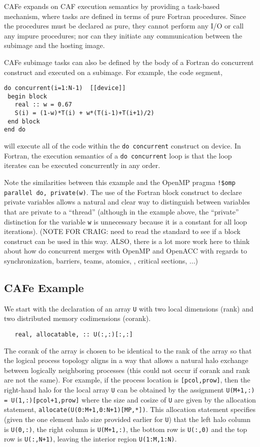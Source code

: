 CAFe expands on CAF execution semantics by providing a task-based mechanism, where tasks
are defined in terms of pure Fortran procedures.  Since the procedures must be declared
as pure, they cannot perform any I/O or call any impure procedures; nor can they initiate
any communication between the subimage and the hosting image.

CAFe subimage tasks can also be defined by the body of a Fortran do concurrent construct
and executed on a subimage.  For example, the code segment,
\begin{verbatim}
do concurrent(i=1:N-1)  [[device]]
 begin block
   real :: w = 0.67
   S(i) = (1-w)*T(i) + w*(T(i-1)+T(i+1)/2)
 end block
end do
\end{verbatim}
will execute all of the code within the \texttt{do concurrent} construct on device.  In
Fortran, the execution semantics of a \texttt{do concurrent} loop is that the loop
iterates can be executed concurrently in any order.

Note the similarities between this example and the OpenMP pragma \texttt{!\$omp parallel do,
private(w)}.  The use of the Fortran block construct to declare private
variables allows a natural and clear way to distinguish between variables that are private
to a ``thread'' (although in the example above, the ``private'' distinction for the
variable \texttt{w} is unnecessary because it is a constant for all loop iterations).
(NOTE FOR CRAIG: need to read the standard to see if a block construct can be used in this
way. ALSO, there is a lot more work here to think about how do concurrent merges with
OpenMP and OpenACC with regards to synchronization, barriers, teams, atomics,
, critical sections, ...)



\subsection{CAFe Example}

We start with the declaration of an array \texttt{U} with two local dimensions (rank) and
two distributed memory codimensions (corank).
\begin{verbatim}
   real, allocatable, :: U(:,:)[:,:]
\end{verbatim}
The corank of the array is chosen to be identical to the rank of the array so that the logical
process topology aligns in a way that allows a natural halo exchange between logically neighboring
processes (this could not occur if corank and rank are not the same).  For example, if the process
location is \texttt{[pcol,prow]}, then the right-hand halo for the local array \texttt{U} can be
obtained by the assignment
\texttt{U(M+1,:) = U(1,:)[pcol+1,prow]} where the size and cosize of
\texttt{U} are given by the allocation statement,
\texttt{allocate(U(0:M+1,0:N+1)[MP,*])}.
This allocation statement specifies (given the one element halo size provided earlier for
\texttt{U}) that the left halo column is \texttt{U(0,:)}, the right column is \texttt{U(M+1,:)},
the bottom row is \texttt{U(:,0)} and the top row is \texttt{U(:,N+1)}, leaving the interior region
\texttt{U(1:M,1:N)}.

